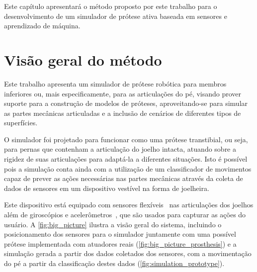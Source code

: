Este capítulo apresentará o método proposto por este trabalho para o desenvolvimento de um simulador de prótese ativa baseada em sensores e aprendizado de máquina.

\section{Visão geral do método}\label{sec:metodo_protese}

Este trabalho apresenta um simulador de prótese robótica para membros inferiores ou, mais especificamente, para as articulações do pé, visando prover suporte para a construção de modelos de próteses, aproveitando-se para simular as partes mecânicas articuladas e a inclusão de cenários de diferentes tipos de superfícies.

O simulador foi projetado para funcionar como uma prótese transtibial, ou seja, para pernas que contenham a articulação do joelho intacta, atuando sobre a rigidez de suas articulações para adaptá-la a diferentes situações. Isto é possível pois a simulação conta ainda com a utilização de um classificador de movimentos capaz de prever as ações necessárias nas partes mecânicas através da coleta de dados de sensores em um dispositivo vestível na forma de joelheira.

Este dispositivo está equipado com sensores flexíveis~\cite{flex:datasheet} nas articulações dos joelhos além de giroscópios e acelerômetros~\cite{invensense:imu_mpu}, que são usados para capturar as ações do usuário. A \autoref{fig:big_picture} ilustra a visão geral do sistema, incluindo o posicionamento dos sensores para o simulador juntamente com uma possível prótese implementada com atuadores reais (\autoref{fig:big_picture_prosthesis}) e a simulação gerada a partir dos dados coletados dos sensores, com a movimentação do pé a partir da classificação destes dados (\autoref{fig:simulation_prototype}).


